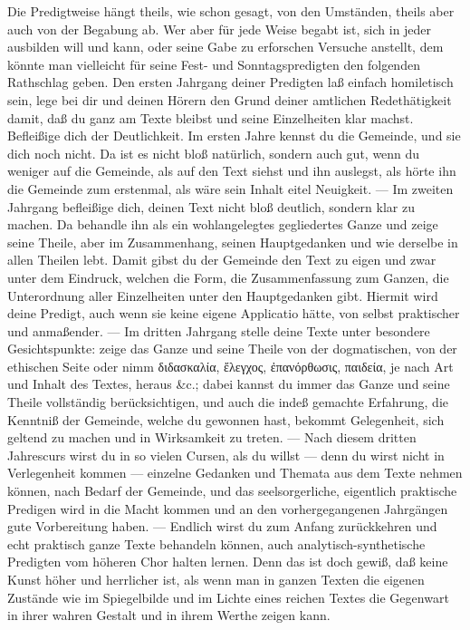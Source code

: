 Die Predigtweise hängt theils, wie schon gesagt, von den Umständen, theils aber auch von der Begabung ab. Wer aber für jede Weise begabt ist, sich in jeder ausbilden will und kann, oder seine Gabe zu erforschen Versuche anstellt, dem könnte man vielleicht für seine Fest- und Sonntagspredigten den folgenden Rathschlag geben. Den ersten Jahrgang deiner Predigten laß einfach homiletisch sein, lege bei dir und deinen Hörern den Grund deiner amtlichen Redethätigkeit damit, daß du ganz am Texte bleibst und seine Einzelheiten klar machst. Befleißige dich der Deutlichkeit. Im ersten Jahre kennst du die Gemeinde, und sie dich noch nicht. Da ist es nicht
bloß natürlich, sondern auch gut, wenn du weniger auf die Gemeinde, als auf den Text siehst und ihn auslegst, als hörte ihn die Gemeinde zum erstenmal, als wäre sein Inhalt eitel Neuigkeit. — Im zweiten Jahrgang befleißige dich, deinen Text nicht bloß deutlich, sondern klar zu machen. Da behandle ihn als ein wohlangelegtes gegliedertes Ganze und zeige seine Theile, aber im Zusammenhang, seinen Hauptgedanken und wie derselbe in allen Theilen lebt. Damit gibst du der Gemeinde den Text zu eigen und zwar unter dem Eindruck, welchen die Form, die Zusammenfassung zum Ganzen, die Unterordnung aller Einzelheiten unter den Hauptgedanken gibt. Hiermit wird deine Predigt, auch wenn sie keine eigene Applicatio hätte, von selbst praktischer und anmaßender. — Im dritten Jahrgang stelle deine Texte unter besondere Gesichtspunkte: zeige das Ganze und seine Theile von der dogmatischen, von der ethischen Seite oder nimm διδασκαλία, ἔλεγχος, ἐπανόρθωσις, παιδεία, je nach Art und Inhalt des Textes, heraus \&c.; dabei kannst du immer das Ganze und seine Theile vollständig berücksichtigen, und auch die indeß gemachte Erfahrung, die Kenntniß der Gemeinde, welche du gewonnen hast, bekommt Gelegenheit, sich geltend zu machen und in Wirksamkeit zu treten. — Nach diesem dritten Jahrescurs wirst du in so vielen Cursen, als du willst — denn du wirst nicht in Verlegenheit kommen — einzelne Gedanken und Themata aus dem Texte nehmen können, nach Bedarf der Gemeinde, und das seelsorgerliche, eigentlich praktische Predigen wird in die Macht kommen und an den vorhergegangenen Jahrgängen gute Vorbereitung haben.
— Endlich wirst du zum Anfang zurückkehren und echt praktisch ganze Texte behandeln können, auch analytisch-synthetische Predigten vom höheren Chor halten lernen. Denn das ist doch gewiß, daß keine Kunst höher und herrlicher ist, als wenn man in ganzen Texten die eigenen Zustände wie im Spiegelbilde und im Lichte eines reichen Textes die Gegenwart in ihrer wahren Gestalt und in ihrem Werthe zeigen kann.

